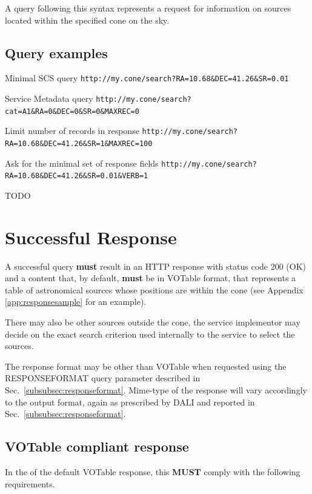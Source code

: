 \documentclass[11pt,a4paper]{ivoa}
\begin{document}
A query following this syntax represents a request for information on sources located within the specified cone on the sky.

\subsection{Query examples}
\begin{bigdescription}
\item[Minimal SCS query] \texttt{http://my.cone/search?RA=10.68\&DEC=41.26\&SR=0.01}
\item[Service Metadata query] \texttt{http://my.cone/search?cat=A1\&RA=0\&DEC=0\&SR=0\&MAXREC=0}
\item[Limit number of records in response] \texttt{http://my.cone/search?RA=10.68\&DEC=41.26\&SR=1\&MAXREC=100}
\item[Ask for the minimal set of response fields] \texttt{http://my.cone/search?RA=10.68\&DEC=41.26\&SR=0.01\&VERB=1}
\end{bigdescription}

TODO

\section{Successful Response}
\label{sec:response}
A successful query \textbf{must} result in an HTTP response with status code 200 (OK) and a content that, by default, \textbf{must} be in VOTable format, that represents a table of astronomical sources whose positions are within the cone (see Appendix \ref{app:responsesample} for an example).  

There may also be other sources outside the cone, the service implementor may decide on the exact search criterion used internally to the service to select the sources.

The response format may be other than VOTable when requested using the RESPONSEFORMAT query parameter described in Sec.~\ref{subsubsec:responseformat}. Mime-type of the response will vary accordingly to the output format, again as prescribed by DALI and reported in Sec.~\ref{subsubsec:responseformat}.

\subsection{VOTable compliant response}

In the of the default VOTable response, this \textbf{MUST} comply with the following requirements.
\end{document}
